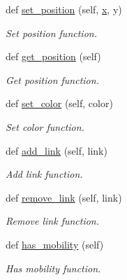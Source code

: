 \begin{DoxyCompactItemize}
def \hyperlink{classvisualizer_1_1core_1_1Node_ad5ef274a1963d3c93b6ec75515efd8ae}{set\+\_\+position} (self, \hyperlink{lte__link__budget__x2__handover__measures_8m_a9336ebf25087d91c818ee6e9ec29f8c1}{x}, y)
\begin{DoxyCompactList}\small\item\em Set position function. \end{DoxyCompactList}\item 
def \hyperlink{classvisualizer_1_1core_1_1Node_a3282926af9cc338df801ba1789019e8e}{get\+\_\+position} (self)
\begin{DoxyCompactList}\small\item\em Get position function. \end{DoxyCompactList}\item 
def \hyperlink{classvisualizer_1_1core_1_1Node_aa50f8c1b99b627e1509fe273af6096ca}{set\+\_\+color} (self, color)
\begin{DoxyCompactList}\small\item\em Set color function. \end{DoxyCompactList}\item 
def \hyperlink{classvisualizer_1_1core_1_1Node_a2c352bc738af315d132a7fbf7482a289}{add\+\_\+link} (self, link)
\begin{DoxyCompactList}\small\item\em Add link function. \end{DoxyCompactList}\item 
def \hyperlink{classvisualizer_1_1core_1_1Node_a7602ce0071d067d756bea462a598a119}{remove\+\_\+link} (self, link)
\begin{DoxyCompactList}\small\item\em Remove link function. \end{DoxyCompactList}\item 
def \hyperlink{classvisualizer_1_1core_1_1Node_ad470742fd4716201bf4aa0a6f4a619b6}{has\+\_\+mobility} (self)
\begin{DoxyCompactList}\small\item\em Has mobility function. \end{DoxyCompactList}\end{DoxyCompactItemize}
